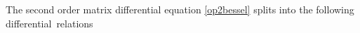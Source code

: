 \documentclass[12pt]{amsart}
\newtheorem{corollary}{Corollary}[section]
\begin{document}
The second order matrix differential equation \eqref{op2bessel} splits into the following differential~relations 
\end{document}
